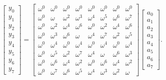 \documentclass[11  pt]{article}
\begin{document}
\begin{equation*}
    \begin{bmatrix}
        y_0 \\ y_1 \\ y_2 \\ y_3 \\ y_4 \\ y_5 \\ y_6 \\ y_7
    \end{bmatrix}
    =
    \begin{bmatrix}
        \omega^0 & \omega^0 & \omega^0 & \omega^0 & \omega^0 & \omega^0 & \omega^0 & \omega^0 \\
        \omega^0 & \omega & \omega^2 & \omega^3 & \omega^4 & \omega^5 & \omega^6 & \omega^7 \\
        \omega^0 & \omega^2 & \omega^4 & \omega^6 & \omega^0 & \omega^2 & \omega^4 & \omega^6 \\
        \omega^0 & \omega^3 & \omega^6 & \omega & \omega^4 & \omega^7 & \omega^2 & \omega^5 \\
        \omega^0 & \omega^4 & \omega^0 & \omega^4 & \omega^0 & \omega^4 & \omega^0 & \omega^4 \\
        \omega^0 & \omega^5 & \omega^2 & \omega^7 & \omega^4 & \omega & \omega^6 & \omega^3 \\
        \omega^0 & \omega^6 & \omega^4 & \omega^2 & \omega^0 & \omega^6 & \omega^4 & \omega^2 \\
        \omega^0 & \omega^7 & \omega^6 & \omega^5 & \omega^4 & \omega^3 & \omega^2 & \omega
    \end{bmatrix}
    \begin{bmatrix}
        a_0 \\ a_1 \\ a_2 \\ a_3 \\ a_4 \\ a_5 \\ a_6 \\ a_7
    \end{bmatrix}.
\end{equation*}

\vs{1in}
\end{document}
